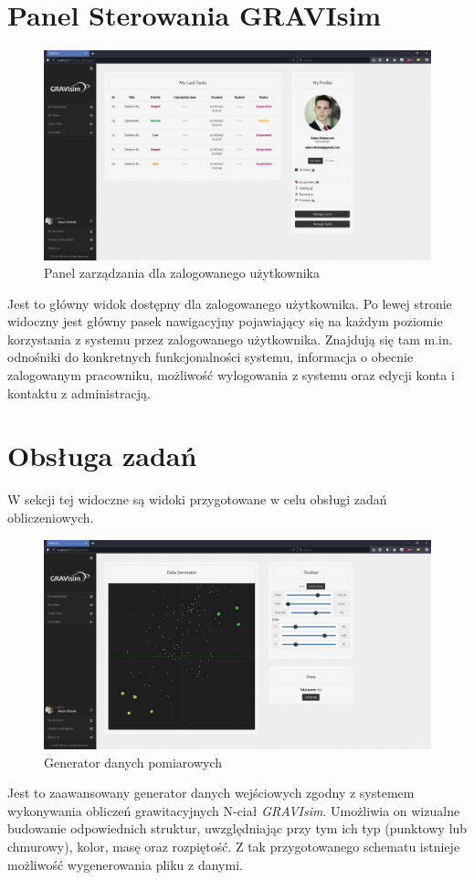 \documentclass[a4paper,onecolumn,oneside,12pt]{memoir}
\begin{document}
{{\section{Panel Sterowania GRAVIsim}
\begin{figure}[h!]
	\centering
	\includegraphics[width=1\linewidth]{pictures/screen-2}
	\caption{Panel zarządzania dla zalogowanego użytkownika}
\end{figure}
Jest to główny widok dostępny dla zalogowanego użytkownika. Po lewej stronie widoczny jest główny pasek nawigacyjny pojawiający się na każdym poziomie korzystania z systemu przez zalogowanego użytkownika. Znajdują się tam m.in. odnośniki do konkretnych funkcjonalności systemu, informacja o obecnie zalogowanym pracowniku, możliwość wylogowania z systemu oraz edycji konta i kontaktu z administracją.
\pagebreak
\vspace*{1mm}
\section{Obsługa zadań}
W sekcji tej widoczne są widoki przygotowane w celu obsługi zadań obliczeniowych.

\begin{figure}[h!]
	\centering
	\includegraphics[width=0.9\linewidth]{pictures/screen-5}
	\caption{Generator danych pomiarowych}
\end{figure}
Jest to zaawansowany generator danych wejściowych zgodny z systemem wykonywania obliczeń grawitacyjnych N-ciał \textit{GRAVIsim}. Umożliwia on wizualne budowanie odpowiednich struktur, uwzględniając przy tym ich typ (punktowy lub chmurowy), kolor, masę oraz rozpiętość. Z tak przygotowanego schematu istnieje możliwość wygenerowania pliku z danymi.

}}
\end{document}
